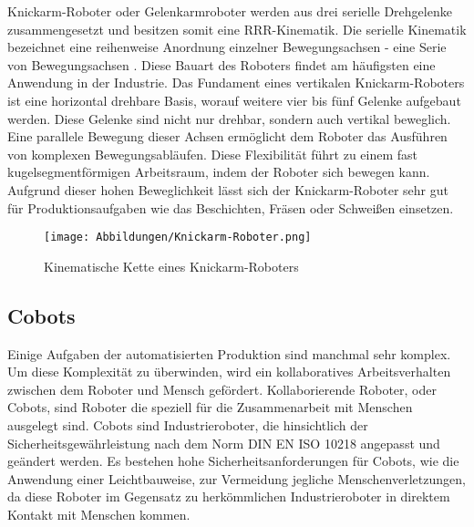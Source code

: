 Knickarm-Roboter oder Gelenkarmroboter werden aus drei serielle Drehgelenke zusammengesetzt und besitzen somit eine RRR-Kinematik. Die serielle Kinematik bezeichnet eine reihenweise Anordnung einzelner Bewegungsachsen - eine Serie von Bewegungsachsen \autocite[84]{maier2022grundlagen}. Diese Bauart des Roboters findet am häufigsten eine Anwendung in der Industrie. Das Fundament eines vertikalen Knickarm-Roboters ist eine horizontal drehbare Basis, worauf weitere vier bis fünf Gelenke aufgebaut werden. Diese Gelenke sind nicht nur drehbar, sondern auch vertikal beweglich. Eine parallele Bewegung dieser Achsen ermöglicht dem Roboter das Ausführen von komplexen Bewegungsabläufen. Diese Flexibilität führt zu einem fast kugelsegmentförmigen Arbeitsraum, indem der Roboter sich bewegen kann. Aufgrund dieser hohen Beweglichkeit lässt sich der Knickarm-Roboter sehr gut für Produktionsaufgaben wie das Beschichten, Fräsen oder Schweißen einsetzen. \autocite[116-117]{maier2022grundlagen}

\begin{figure}[h]
	\texttt{[image: Abbildungen/Knickarm-Roboter.png]}
	\centering
	\caption{Kinematische Kette eines Knickarm-Roboters \autocite[116]{maier2022grundlagen}}
\end{figure}

\subsection{Cobots} \label{ssec:cobots}
Einige Aufgaben der automatisierten Produktion sind manchmal sehr komplex. Um diese Komplexität zu überwinden, wird ein kollaboratives Arbeitsverhalten zwischen dem Roboter und Mensch gefördert. Kollaborierende Roboter, oder Cobots, sind Roboter die speziell für die Zusammenarbeit mit Menschen ausgelegt sind. Cobots sind Industrieroboter, die hinsichtlich der Sicherheitsgewährleistung nach dem Norm DIN EN ISO 10218 angepasst und geändert werden. Es bestehen hohe Sicherheitsanforderungen für Cobots, wie die Anwendung einer Leichtbauweise, zur Vermeidung jegliche Menschenverletzungen, da diese Roboter im Gegensatz zu herkömmlichen Industrieroboter in direktem Kontakt mit Menschen kommen. \autocite[181-183]{maier2022grundlagen}

